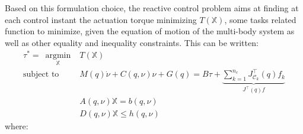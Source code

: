 \documentclass[12pt,a4paper,twoside]{article}
\newcommand{\vect}[1]{\mbox{\boldmath${#1}$}}%
\DeclareMathOperator*{\argmin}{argmin}
\begin{document}
Based on this formulation choice, the reactive control problem aims at finding at each control instant the actuation torque minimizing $T(\mathbb{X})$, some tasks related function to minimize, given the equation of motion of the multi-body system as well as other equality and inequality constraints. This can be written:
\begin{subequations}\label{eq:one task}
\begin{eqnarray}
{\tau}^* =~\argmin \limits_{\mathbb{X}} & T(\mathbb{X}) \label{eq:cp obj}\\  
\text{subject to} 
  & {M}(q) {\dot{\nu}}+{C}({q},{\nu}){\nu} + G(q) = {B} {\tau} + \underbrace{\sum_{k = 1}^{n_c} {J}^\top_{\mathcal{C}_k}(q) f_k}_{J^\top(q) f} \label{eq:cp dyn model}\\ 
  & {A}(q,\nu) \mathbb{X}   =  {b}(q,\nu)  \label{eq:cp eq cons} \\
  & {D}(q,\nu) \mathbb{X} \leq {h}(q,\nu)  \label{eq:cp ineq cons}
\end{eqnarray}               
\end{subequations}
where:
\end{document}
